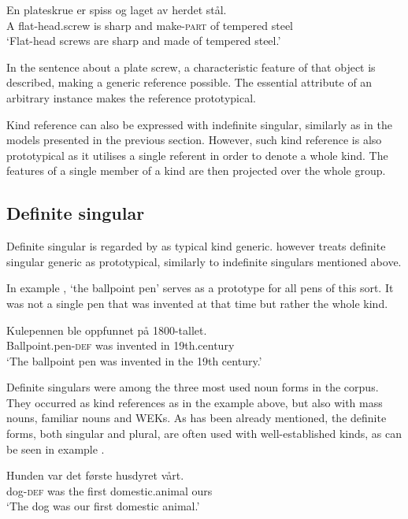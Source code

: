 \documentclass[output=paper]{langsci/langscibook}
\begin{document}
\ea\label{ex:skrue}
	\gll En plateskrue er spiss og laget av herdet stål. \\
		A flat-head.screw is sharp and make-\textsc{part} of tempered steel \\
	\glt `Flat-head screws are sharp and made of tempered steel.'
\z

In the sentence about a plate screw, a characteristic feature of that object is described, making a generic reference possible. The essential attribute \citep[111]{Radden2007} of an arbitrary instance \citep[224]{Radden2009} makes the reference prototypical.

Kind reference can also be expressed with indefinite singular, similarly as in the models presented in the previous section. However, such kind reference is also prototypical as it utilises a single referent in order to denote a whole kind. The features of a single member of a kind are then projected over the whole group.

\subsection{Definite singular}
\label{sub:defsg}
Definite singular is regarded by \citet{Radden2009} as typical kind generic. \citet{Pettersson1976} however treats definite singular generic as prototypical, similarly to indefinite singulars mentioned above.

In example , `the ballpoint pen' serves as a prototype for all pens of this sort. It was not a single pen that was invented at that time but rather the whole kind.

\ea\label{ex:ballpointpen}
	\gll Kulepennen ble oppfunnet på 1800-tallet. \\
		Ballpoint.pen-\textsc{def} was invented in 19th.century \\
	\glt `The ballpoint pen was invented in the 19th century.'
\z
	
Definite singulars were among the three most used noun forms in the corpus. They occurred as kind references as in the example above, but also with mass nouns, familiar nouns and WEKs. As has been already mentioned, the definite forms, both singular and plural, are often used with well-established kinds, as can be seen in example .

\ea\label{ex:dog}
	\gll Hunden var det første husdyret vårt. \\
		dog-\textsc{def} was the first domestic.animal ours \\
	\glt `The dog was our first domestic animal.'
\z
\end{document}
